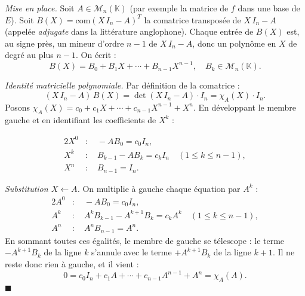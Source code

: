 
\begin{mdframed}[style=proofbar]
  \textit{Mise en place.} Soit $A \in \mathcal{M}_n(\mathbb{K})$ (par
  exemple la matrice de $f$ dans une base de $E$). Soit
  $B(X) = {\mathrm{com}(X\,I_n-A)}^T$ la comatrice transposée de
  $X\,I_n-A$ (appelée \emph{adjugate} dans la littérature anglophone).
  Chaque entrée de $B(X)$ est, au signe près, un mineur d'ordre $n-1$ de
  $X\,I_n-A$, donc un polynôme en $X$ de degré au plus $n-1$. On écrit :
  \[
    B(X) = B_0 + B_1 X + \cdots + B_{n-1} X^{n-1}, \quad B_k \in \mathcal{M}_n(\mathbb{K}).
  \]

  \textit{Identité matricielle polynomiale.} Par définition de la comatrice :
  \[
    (X\,I_n - A)\,B(X) = \det(X\,I_n - A)\cdot I_n = \chi_A(X)\cdot I_n.
  \]
  Posons $\chi_A(X) = c_0 + c_1 X + \cdots + c_{n-1}X^{n-1} + X^n$.
  En développant le membre gauche et en identifiant les coefficients de $X^k$ :

  \begin{alignat*}{2}
    X^0 &: \quad -A B_0 = c_0 I_n, \\
    X^k &: \quad B_{k-1} - A B_k = c_k I_n \quad (1\leq k \leq n-1), \\
    X^n &: \quad B_{n-1} = I_n.
  \end{alignat*}

  \textit{Substitution $X \leftarrow A$.}
  On multiplie à gauche chaque équation par $A^k$ :
  \begin{alignat*}{2}
    A^0 &: \quad -A B_0 = c_0 I_n, \\
    A^k &: \quad A^k B_{k-1} - A^{k+1} B_k = c_k A^k \quad (1\leq k \leq n-1), \\
    A^n &: \quad A^n B_{n-1} = A^n.
  \end{alignat*}
  En sommant toutes ces égalités, le membre de gauche se télescope : le terme
  $-A^{k+1} B_k$ de la ligne $k$ s'annule avec le terme $+A^{k+1} B_k$ de la
  ligne $k+1$. Il ne reste donc rien à gauche, et il vient :
  \[
    0 = c_0 I_n + c_1 A + \cdots + c_{n-1}A^{n-1} + A^n = \chi_A(A).
  \]
  $\blacksquare$
\end{mdframed}


